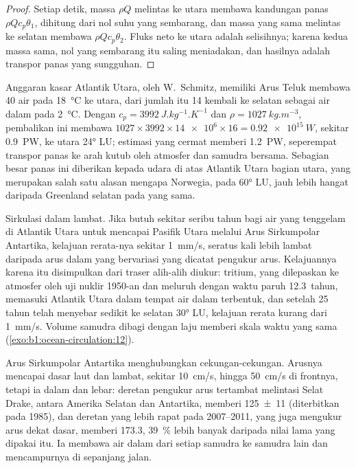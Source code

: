 \begin{proof}
Setiap detik, massa $\rho Q$ melintas ke utara membawa kandungan panas $\rho Q
c_p\theta_1$, dihitung dari nol suhu yang sembarang, dan massa yang sama melintas ke selatan membawa $\rho Q c_p\theta_2$. Fluks neto ke utara adalah selisihnya; karena kedua massa sama, nol yang sembarang itu saling meniadakan, dan hasilnya adalah transpor panas yang sungguhan.
\end{proof}

Anggaran kasar Atlantik Utara, oleh W.~Schmitz, memiliki Arus Teluk membawa \qty{40}{\sverdrup} air pada \qty{18}{\celsius} ke utara, dari jumlah itu
\qty{14}{\sverdrup} kembali ke selatan sebagai air dalam pada \qty{2}{\celsius}. Dengan $c_p =
\qty{3992}{J.kg^{-1}.K^{-1}}$ dan $\rho = \qty{1027}{kg.m^{-3}}$, pembalikan ini membawa $1027 \times 3992 \times \num{14e6} \times 16 = \qty{0.92e15}{W}$, sekitar \qty{0.9}{PW}, ke utara \ang{24} LU; estimasi yang cermat memberi \qty{1.2}{PW}, seperempat transpor panas ke arah kutub oleh atmosfer dan samudra bersama. Sebagian besar panas ini diberikan kepada udara di atas Atlantik Utara bagian utara, yang merupakan salah satu alasan mengapa Norwegia, pada \ang{60} LU, jauh lebih hangat daripada Greenland selatan pada  yang sama.

Sirkulasi dalam lambat. Jika butuh sekitar seribu tahun bagi air yang tenggelam di Atlantik Utara untuk mencapai Pasifik Utara melalui Arus Sirkumpolar Antartika, kelajuan rerata-nya sekitar \qty{1}{mm/s}, seratus kali lebih lambat daripada arus dalam yang bervariasi yang dicatat pengukur arus. Kelajuannya karena itu disimpulkan dari traser alih-alih diukur: tritium, yang dilepaskan ke atmosfer oleh uji nuklir 1950-an dan meluruh dengan waktu paruh \qty{12.3}{tahun}, memasuki Atlantik Utara dalam tempat air dalam terbentuk, dan setelah 25 tahun telah menyebar sedikit ke selatan \ang{30} LU, kelajuan rerata kurang dari \qty{1}{mm/s}. Volume samudra dibagi dengan laju  memberi skala waktu yang sama (\cref{exo:b1:ocean-circulation:12}).

Arus Sirkumpolar Antartika menghubungkan cekungan-cekungan. Arusnya mencapai dasar laut dan lambat, sekitar \qty{10}{cm/s}, hingga \qty{50}{cm/s} di frontnya, tetapi ia dalam dan lebar: deretan pengukur arus tertambat melintasi Selat Drake, antara Amerika Selatan dan Antartika, memberi \qty[uncertainty-mode=separate]{125 \pm 11}{\sverdrup} (diterbitkan pada 1985), dan deretan yang lebih rapat pada 2007--2011, yang juga mengukur arus dekat dasar, memberi \qty{173.3}{\sverdrup}, \qty{39}{\percent} lebih banyak daripada nilai lama yang dipakai itu. Ia membawa air dalam dari setiap samudra ke samudra lain dan mencampurnya di sepanjang jalan.

